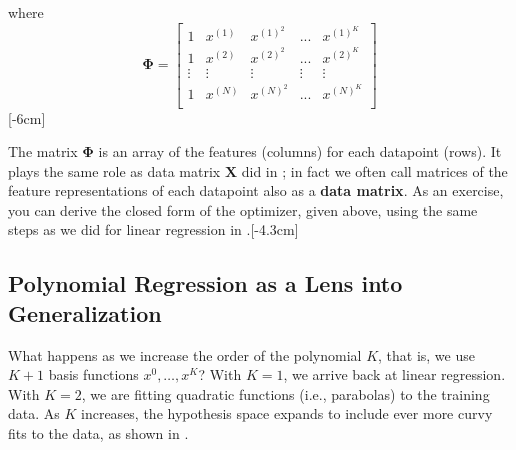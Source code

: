 where
\begin{equation}
    \mathbf{\Phi} = 
     \begin{bmatrix}
        1 & x^{(1)} & x^{(1)^2} & ... & x^{(1)^K} \\
        1 & x^{(2)} & x^{(2)^2} & ... & x^{(2)^K} \\
        \vdots & \vdots & \vdots & \vdots & \vdots \\
        1 & x^{(N)} & x^{(N)^2} & ... & x^{(N)^K}  \\
    \end{bmatrix}
\end{equation}
[-6cm]

The matrix $\mathbf{\Phi}$ is an array of the features (columns) for each datapoint (rows). It plays the same role as data matrix $\mathbf{X}$ did in \chap{\ref{chapter:intro_to_learning}}; in fact we often call matrices of the feature representations of each datapoint also as a \textbf{data matrix}. As an exercise, you can derive the closed form of the optimizer, given above, using the same steps as we did for linear regression in \chap{\ref{chapter:intro_to_learning}}.[-4.3cm]

\subsection{Polynomial Regression as a Lens into Generalization}

What happens as we increase the order of the polynomial $K$, that is, we use $K+1$ basis functions $x^0, \ldots, x^K$? With $K=1$, we arrive back at linear regression. With $K=2$, we are fitting quadratic functions (i.e., parabolas) to the training data. As $K$ increases, the hypothesis space expands to include ever more curvy fits to the data, as shown in \fig{\ref{fig:under_and_overfitting}}.

